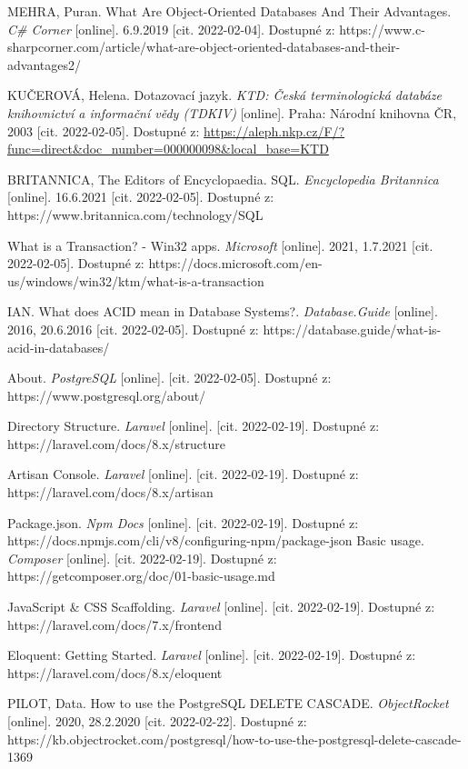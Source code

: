 \begin{thebibliography}{55}
MEHRA, Puran. What Are Object-Oriented Databases And Their Advantages. \textit{C\# Corner} [online]. 6.9.2019 [cit. 2022-02-04]. Dostupné z: https://www.c-sharpcorner.com/article/what-are-object-oriented-databases-and-their-advantages2/

KUČEROVÁ, Helena. Dotazovací jazyk. \textit{KTD: Česká terminologická databáze knihovnictví a informační vědy (TDKIV)} [online]. Praha: Národní knihovna ČR, 2003 [cit. 2022-02-05]. Dostupné z: \url{https://aleph.nkp.cz/F/?func=direct&doc\_number=000000098&local\_base=KTD}

BRITANNICA, The Editors of Encyclopaedia. SQL. \textit{Encyclopedia Britannica} [online]. 16.6.2021 [cit. 2022-02-05]. Dostupné z: https://www.britannica.com/technology/SQL

What is a Transaction? - Win32 apps. \textit{Microsoft} [online]. 2021, 1.7.2021 [cit. 2022-02-05]. Dostupné z: https://docs.microsoft.com/en-us/windows/win32/ktm/what-is-a-transaction

IAN. What does ACID mean in Database Systems?. \textit{Database.Guide} [online]. 2016, 20.6.2016 [cit. 2022-02-05]. Dostupné z: https://database.guide/what-is-acid-in-databases/

About. \textit{PostgreSQL} [online]. [cit. 2022-02-05]. Dostupné z: https://www.postgresql.org/about/

Directory Structure. \textit{Laravel} [online]. [cit. 2022-02-19]. Dostupné z: https://laravel.com/docs/8.x/structure

Artisan Console. \textit{Laravel} [online]. [cit. 2022-02-19]. Dostupné z: https://laravel.com/docs/8.x/artisan

Package.json. \textit{Npm Docs} [online]. [cit. 2022-02-19]. Dostupné z: https://docs.npmjs.com/cli/v8/configuring-npm/package-json
Basic usage. \textit{Composer} [online]. [cit. 2022-02-19]. Dostupné z: https://getcomposer.org/doc/01-basic-usage.md

JavaScript \& CSS Scaffolding. \textit{Laravel} [online]. [cit. 2022-02-19]. Dostupné z: https://laravel.com/docs/7.x/frontend

Eloquent: Getting Started. \textit{Laravel} [online]. [cit. 2022-02-19]. Dostupné z: https://laravel.com/docs/8.x/eloquent

PILOT, Data. How to use the PostgreSQL DELETE CASCADE. \textit{ObjectRocket} [online]. 2020, 28.2.2020 [cit. 2022-02-22]. Dostupné z: https://kb.objectrocket.com/postgresql/how-to-use-the-postgresql-delete-cascade-1369


\end{thebibliography}
